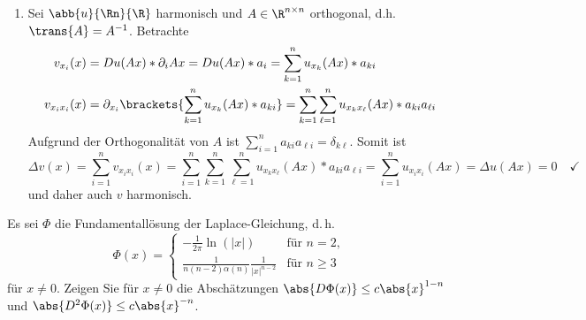 \begin{exercisePage}
\begin{enumerate}[label=(zu \alph*), leftmargin=*]
		\item Sei $\abb{u}{\Rn}{\R}$ harmonisch und $A \in \R^{n \times n}$ orthogonal, d.h. $\trans{A} = A^{-1}$. Betrachte
		\begin{equation*}
			\begin{aligned}
				v_{x_i}(x) &= Du(Ax) * \partial_i Ax = Du(Ax) * a_i = \sum_{k=1}^n u_{x_k}(Ax) * a_{ki} \\
				v_{x_i x_i}(x) &= \partial_{x_i} \brackets{\sum_{k=1}^n u_{x_k}(Ax) * a_{ki}} 
				= \sum_{k=1}^n \sum_{\ell=1}^n u_{x_k x_\ell}(Ax) * a_{ki} a_{\ell i}
			\end{aligned}
		\end{equation*}
		Aufgrund der Orthogonalität von $A$ ist $\sum_{i=1}^n a_{ki} a_{\ell i} = \delta_{k \ell}$. Somit ist
		\begin{equation*}
			\Delta v(x) = \sum_{i=1}^n v_{x_i x_i}(x) = \sum_{i=1}^n \sum_{k=1}^n \sum_{\ell=1}^n u_{x_k x_\ell}(Ax) * a_{ki} a_{\ell i}
			= \sum_{i=1}^n u_{x_i x_i}(Ax) 
			= \Delta u(Ax) = 0 \quad \checkmark
		\end{equation*}
		und daher auch $v$ harmonisch.
	\end{enumerate}
	
	\begin{task}
		Es sei $\Phi$ die Fundamentallösung der Laplace-Gleichung, d.\,h.
		\begin{equation*}
			\Phi(x) = \begin{cases} 
				-\frac{1}{2\pi} \ln (|x|) &\text{für } n=2,\\
				\frac{1}{n(n-2)\alpha(n)} \frac{1}{|x|^{n-2}} &\text{für } n \geq 3 
			\end{cases}
		\end{equation*}
		für $x\neq 0$. Zeigen Sie für $x\neq 0$ die Abschätzungen $\abs{D\Phi(x)} \le c \abs{x}^{1-n}$ und $\abs{D^2\Phi(x)} \le c \abs{x}^{-n}$.
	\end{task}
	

\end{exercisePage}

